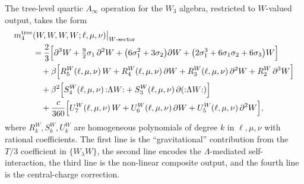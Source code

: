 \begin{theorem}
\label{thm:m4-WWWW-tree}
The tree-level quartic $A_\infty$ operation for the $W_3$ algebra,
restricted to $W$-valued output, takes the form
\begin{align}
\label{eq:m4-WWWW-explicit}
m_4^{\mathrm{tree}}&(W,W,W,W;\ell,\mu,\nu)\big|_{W\text{-sector}}
\notag\\
&= \frac{2}{3}\Bigl[
 \partial^3 W
 + \tfrac{9}{2}\sigma_1\,\partial^2 W
 + \bigl(6\sigma_1^2 + 3\sigma_2\bigr)\partial W
 + \bigl(2\sigma_1^3 + 6\sigma_1\sigma_2 + 6\sigma_3\bigr)W
 \Bigr] \notag\\
&\quad + \beta\Bigl[
 R_5^W(\ell,\mu,\nu)\,W
 + R_4^W(\ell,\mu,\nu)\,\partial W
 + R_3^W(\ell,\mu,\nu)\,\partial^2 W
 + R_2^W\,\partial^3 W
 \Bigr] \notag\\
&\quad + \beta^2\Bigl[
 S_4^W(\ell,\mu,\nu)\,{:}\Lambda W{:}
 + S_3^W(\ell,\mu,\nu)\,\partial({:}\Lambda W{:})
 \Bigr] \notag\\
&\quad + \frac{c}{360}\Bigl[
 U_7^W(\ell,\mu,\nu)\,W
 + U_6^W(\ell,\mu,\nu)\,\partial W
 + U_5^W(\ell,\mu,\nu)\,\partial^2 W
 \Bigr],
\end{align}
where $R_k^W, S_k^W, U_k^W$ are homogeneous polynomials of degree
$k$ in $\ell, \mu, \nu$ with rational coefficients. The first line
is the ``gravitational'' contribution from the $T/3$ coefficient
in $\{W_\lambda W\}$, the second line encodes the $\Lambda$-mediated
self-interaction, the third line is the non-linear composite output,
and the fourth line is the central-charge correction.
\end{theorem}

